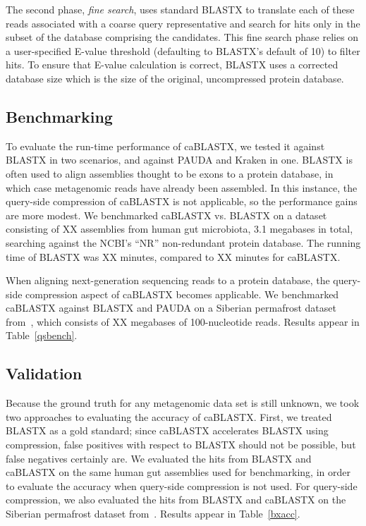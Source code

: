 \documentclass{amsbook}
\theoremstyle{definition}
\theoremstyle{remark}
\numberwithin{equation}{section}
\begin{document}
The second phase, \emph{fine search}, uses standard BLASTX to translate each
of these reads associated with a coarse query representative and search for
hits only in the subset of the database comprising the candidates.
This fine search phase relies on a user-specified E-value threshold (defaulting
to BLASTX's default of 10) to filter hits.
To ensure that E-value calculation is correct, BLASTX uses a corrected database
size which is the size of the original, uncompressed protein database.

\subsection*{Benchmarking}

To evaluate the run-time performance of caBLASTX, we tested it against
BLASTX in two scenarios, and against PAUDA and Kraken in one.
BLASTX is often used to align assemblies thought to be exons to a protein
database, in which case metagenomic reads have already been assembled.
In this instance, the query-side compression of caBLASTX is not applicable, so
the performance gains are more modest.
We benchmarked caBLASTX vs. BLASTX on a dataset consisting of XX assemblies
from human gut microbiota, 3.1 megabases in total, searching against the NCBI's
``NR'' non-redundant protein database.
The running time of BLASTX was XX minutes, compared to XX minutes for caBLASTX.

When aligning next-generation sequencing reads to a protein database, the
query-side compression aspect of caBLASTX becomes applicable.
We benchmarked caBLASTX against BLASTX and PAUDA on a Siberian
permafrost dataset from~\cite{blah}, which consists of XX megabases of
100-nucleotide reads.
Results appear in Table~\ref{qsbench}.



\subsection*{Validation}

Because the ground truth for any metagenomic data set is still unknown,
we took two approaches to evaluating the accuracy of caBLASTX.
First, we treated BLASTX as a gold standard; since caBLASTX accelerates BLASTX
using compression, false positives with respect to BLASTX should not be
possible, but false negatives certainly are.
We evaluated the hits from BLASTX and caBLASTX on the same human gut
assemblies used for benchmarking, in order to evaluate the accuracy when
query-side compression is not used.
For query-side compression, we also evaluated the hits from BLASTX and caBLASTX
on the Siberian permafrost dataset from~\cite{blah}.
Results appear in Table~\ref{bxacc}.
\end{document}
